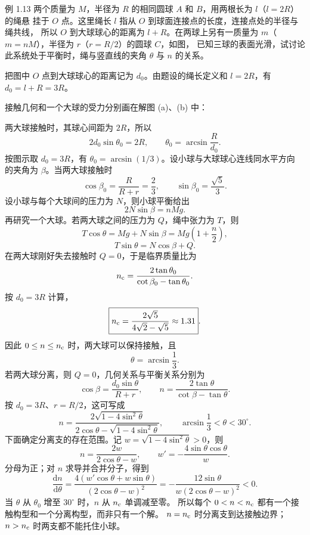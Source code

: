 \begin{origexamplebox}{例 1.13}
两个质量为 $M$，半径为 $R$ 的相同圆球 $A$ 和 $B$，用两根长为 $l$（$l=2R$）的绳悬
挂于 $O$ 点。这里绳长 $l$ 指从 $O$ 到球面连接点的长度，连接点处的半径与绳共线，
所以 $O$ 到大球球心的距离为 $l+R$。在两球上另有一质量为 $m$（$m=nM$），半径为
$r$（$r=R/2$）的圆球 $C$，如图，
已知三球的表面光滑，试讨论此系统处于平衡时，绳与竖直线的夹角 $\theta$ 与 $n$ 的关系。
\end{origexamplebox}

\begin{xesolution}
把图中 $O$ 点到大球球心的距离记为 $d_0$。由题设的绳长定义和 $l=2R$，有
$d_0=l+R=3R$。

接触几何和一个大球的受力分别画在解图 (a)、(b) 中：
\soldiagOneThirteen

两大球接触时，其球心间距为 $2R$，所以
\[
  2d_0\sin\theta_0=2R,
  \qquad
  \theta_0=\arcsin\frac{R}{d_0}.
\]
按图示取 $d_0=3R$，有 $\theta_0=\arcsin(1/3)$。设小球与大球球心连线同水平方向
的夹角为 $\beta$。当两大球接触时
\[
  \cos\beta_0=\frac{R}{R+r}=\frac23,
  \qquad
  \sin\beta_0=\frac{\sqrt5}{3}.
\]
设小球与每个大球间的压力为 $N$，则小球平衡给出
\[
  2N\sin\beta=nMg.
\]
再研究一个大球。若两大球之间的压力为 $Q$，绳中张力为 $T$，则
\[
  T\cos\theta=Mg+N\sin\beta=Mg\left(1+\frac n2\right),
\]
\[
  T\sin\theta=N\cos\beta+Q.
\]
在两大球刚好失去接触时 $Q=0$，于是临界质量比为
\[
  n_{\rm c}
  =\frac{2\tan\theta_0}{\cot\beta_0-\tan\theta_0}.
\]
按 $d_0=3R$ 计算，
\[
  \boxed{n_{\rm c}=\frac{2\sqrt5}{4\sqrt2-\sqrt5}\approx1.31}.
\]
因此 $0\le n\le n_{\rm c}$ 时，两大球可以保持接触，且
\[
  \boxed{\theta=\arcsin\frac13}.
\]
若两大球分离，则 $Q=0$，几何关系与平衡关系分别为
\[
  \cos\beta=\frac{d_0\sin\theta}{R+r},
  \qquad
  \boxed{n=\frac{2\tan\theta}{\cot\beta-\tan\theta}}.
\]
按 $d_0=3R$、$r=R/2$，这可写成
\[
  \boxed{n=\frac{2\sqrt{1-4\sin^2\theta}}
  {2\cos\theta-\sqrt{1-4\sin^2\theta}}},
  \qquad
  \arcsin\frac13<\theta<30^\circ.
\]
下面确定分离支的存在范围。记 $w=\sqrt{1-4\sin^2\theta}>0$，则
\[
 n=\frac{2w}{2\cos\theta-w},\qquad
 w'=-\frac{4\sin\theta\cos\theta}{w}.
\]
分母为正；对 $n$ 求导并合并分子，得到
\[
 \frac{\mathrm dn}{\mathrm d\theta}
 =\frac{4(w'\cos\theta+w\sin\theta)}{(2\cos\theta-w)^2}
 =-\frac{12\sin\theta}{w(2\cos\theta-w)^2}<0.
\]
当 $\theta$ 从 $\theta_0$ 增至 $30^\circ$ 时，$n$ 从 $n_{\rm c}$ 单调减至零。
所以每个 $0<n<n_{\rm c}$ 都有一个接触构型和一个分离构型，而非只有一个解。
$n=n_{\rm c}$ 时分离支到达接触边界；$n>n_{\rm c}$ 时两支都不能托住小球。


\end{xesolution}
